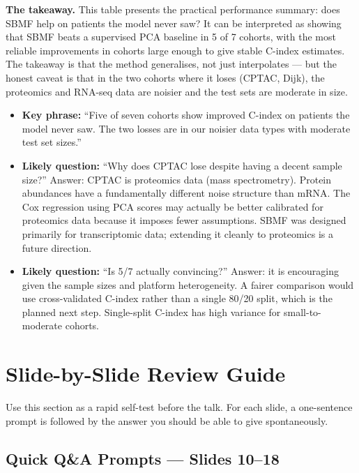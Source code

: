 \documentclass[11pt]{article}
\newcommand{\sectionlabel}[1]{\textbf{#1}}
\begin{document}
\textbf{The takeaway.} This table presents the practical performance summary: does SBMF help on patients the model never saw? It can be interpreted as showing that SBMF beats a supervised PCA baseline in 5 of 7 cohorts, with the most reliable improvements in cohorts large enough to give stable C-index estimates. The takeaway is that the method generalises, not just interpolates --- but the honest caveat is that in the two cohorts where it loses (CPTAC, Dijk), the proteomics and RNA-seq data are noisier and the test sets are moderate in size.

\begin{itemize}
  \item \sectionlabel{Key phrase:} ``Five of seven cohorts show improved C-index on patients the model never saw. The two losses are in our noisier data types with moderate test set sizes.''
  \item \sectionlabel{Likely question:} ``Why does CPTAC lose despite having a decent sample size?'' Answer: CPTAC is proteomics data (mass spectrometry). Protein abundances have a fundamentally different noise structure than mRNA. The Cox regression using PCA scores may actually be better calibrated for proteomics data because it imposes fewer assumptions. SBMF was designed primarily for transcriptomic data; extending it cleanly to proteomics is a future direction.
  \item \sectionlabel{Likely question:} ``Is 5/7 actually convincing?'' Answer: it is encouraging given the sample sizes and platform heterogeneity. A fairer comparison would use cross-validated C-index rather than a single 80/20 split, which is the planned next step. Single-split C-index has high variance for small-to-moderate cohorts.
\end{itemize}

\section*{Slide-by-Slide Review Guide}

\noindent Use this section as a rapid self-test before the talk. For each slide, a one-sentence prompt is followed by the answer you should be able to give spontaneously.

\subsection*{Quick Q\&A Prompts --- Slides 10--18}
\end{document}
